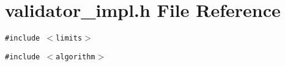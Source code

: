 \section{validator\_\-impl.h File Reference}
\label{validator__impl_8h}
{\tt \#include $<$limits$>$}\par
{\tt \#include $<$algorithm$>$}\par
